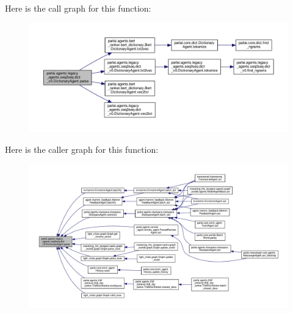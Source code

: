 Here is the call graph for this function\+:
\nopagebreak
\begin{figure}[H]
\begin{center}
\leavevmode
\includegraphics[width=350pt]{classparlai_1_1agents_1_1legacy__agents_1_1seq2seq_1_1dict__v0_1_1DictionaryAgent_a4f1667bb1484f0712678a8f679db6579_cgraph}
\end{center}
\end{figure}
Here is the caller graph for this function\+:
\nopagebreak
\begin{figure}[H]
\begin{center}
\leavevmode
\includegraphics[width=350pt]{classparlai_1_1agents_1_1legacy__agents_1_1seq2seq_1_1dict__v0_1_1DictionaryAgent_a4f1667bb1484f0712678a8f679db6579_icgraph}
\end{center}
\end{figure}
\mbox{\label{classparlai_1_1agents_1_1legacy__agents_1_1seq2seq_1_1dict__v0_1_1DictionaryAgent_a11a20a1798b9c939e2b7347b9d799e7b}} 
